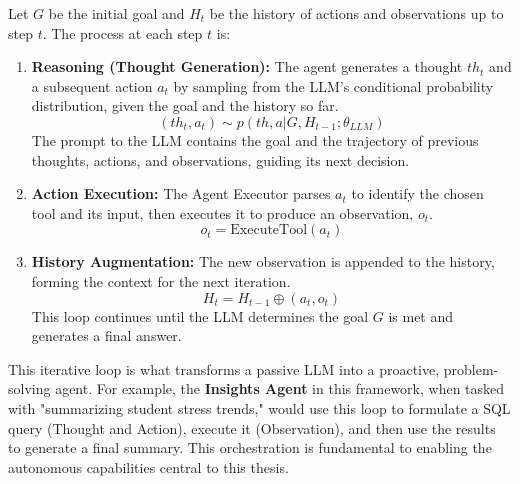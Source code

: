 Let $G$ be the initial goal and $H_t$ be the history of actions and observations up to step $t$. The process at each step $t$ is:
\begin{enumerate}
    \item \textbf{Reasoning (Thought Generation):} The agent generates a thought $th_t$ and a subsequent action $a_t$ by sampling from the LLM's conditional probability distribution, given the goal and the history so far.
    $$ (th_t, a_t) \sim p(th, a | G, H_{t-1}; \theta_{LLM}) $$
    The prompt to the LLM contains the goal and the trajectory of previous thoughts, actions, and observations, guiding its next decision.

    \item \textbf{Action Execution:} The Agent Executor parses $a_t$ to identify the chosen tool and its input, then executes it to produce an observation, $o_t$.
    $$ o_t = \text{ExecuteTool}(a_t) $$

    \item \textbf{History Augmentation:} The new observation is appended to the history, forming the context for the next iteration.
    $$ H_t = H_{t-1} \oplus (a_t, o_t) $$
    This loop continues until the LLM determines the goal $G$ is met and generates a final answer.
\end{enumerate}
This iterative loop is what transforms a passive LLM into a proactive, problem-solving agent. For example, the \textbf{Insights Agent} in this framework, when tasked with "summarizing student stress trends," would use this loop to formulate a SQL query (Thought and Action), execute it (Observation), and then use the results to generate a final summary. This orchestration is fundamental to enabling the autonomous capabilities central to this thesis.


